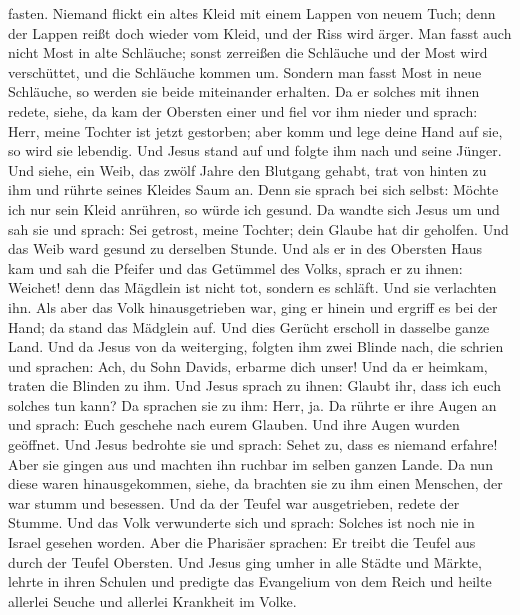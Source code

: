fasten.  Niemand flickt ein altes Kleid mit einem Lappen
von neuem Tuch; denn der Lappen reißt doch wieder vom Kleid, und der
Riss wird ärger.  Man fasst auch nicht Most in alte
Schläuche; sonst zerreißen die Schläuche und der Most wird verschüttet,
und die Schläuche kommen um. Sondern man fasst Most in neue Schläuche,
so werden sie beide miteinander erhalten.  Da er solches
mit ihnen redete, siehe, da kam der Obersten einer und fiel vor ihm
nieder und sprach: Herr, meine Tochter ist jetzt gestorben; aber komm
und lege deine Hand auf sie, so wird sie lebendig.  Und
Jesus stand auf und folgte ihm nach und seine Jünger.  Und
siehe, ein Weib, das zwölf Jahre den Blutgang gehabt, trat von hinten zu
ihm und rührte seines Kleides Saum an.  Denn sie sprach bei
sich selbst: Möchte ich nur sein Kleid anrühren, so würde ich gesund.
 Da wandte sich Jesus um und sah sie und sprach: Sei
getrost, meine Tochter; dein Glaube hat dir geholfen. Und das Weib ward
gesund zu derselben Stunde.  Und als er in des Obersten
Haus kam und sah die Pfeifer und das Getümmel des Volks, 
sprach er zu ihnen: Weichet! denn das Mägdlein ist nicht tot, sondern es
schläft. Und sie verlachten ihn.  Als aber das Volk
hinausgetrieben war, ging er hinein und ergriff es bei der Hand; da
stand das Mädglein auf.  Und dies Gerücht erscholl in
dasselbe ganze Land.  Und da Jesus von da weiterging,
folgten ihm zwei Blinde nach, die schrien und sprachen: Ach, du Sohn
Davids, erbarme dich unser!  Und da er heimkam, traten die
Blinden zu ihm. Und Jesus sprach zu ihnen: Glaubt ihr, dass ich euch
solches tun kann? Da sprachen sie zu ihm: Herr, ja.  Da
rührte er ihre Augen an und sprach: Euch geschehe nach eurem Glauben.
 Und ihre Augen wurden geöffnet. Und Jesus bedrohte sie und
sprach: Sehet zu, dass es niemand erfahre!  Aber sie gingen
aus und machten ihn ruchbar im selben ganzen Lande.  Da nun
diese waren hinausgekommen, siehe, da brachten sie zu ihm einen
Menschen, der war stumm und besessen.  Und da der Teufel
war ausgetrieben, redete der Stumme. Und das Volk verwunderte sich und
sprach: Solches ist noch nie in Israel gesehen worden. 
Aber die Pharisäer sprachen: Er treibt die Teufel aus durch der Teufel
Obersten.  Und Jesus ging umher in alle Städte und Märkte,
lehrte in ihren Schulen und predigte das Evangelium von dem Reich und
heilte allerlei Seuche und allerlei Krankheit im Volke. 
